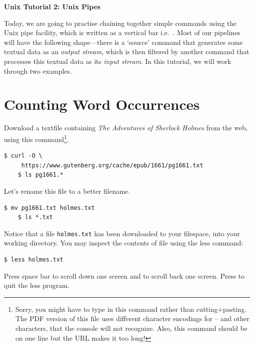 \documentclass{article}
\begin{document}
  
\noindent
{\Large \textsf{\textbf{Unix Tutorial 2: Unix Pipes}}}

\bigskip


Today, we are going to practise chaining together simple commands using the Unix pipe facility, which is written as a vertical bar i.e.\ \textbar.
Most of our pipelines will have the following shape---there is a `source' command that generates some textual data as an \textit{output stream}, which is then filtered by another command that processes this textual data as its \textit{input stream}. In this tutorial, we will work through two examples.

\section*{Counting Word Occurrences}

Download a textfile containing \textit{The Adventures of Sherlock Holmes} from the web, using this command\footnote{Sorry, you might have to type in this command rather than cutting+pasting. The PDF version of this file uses different character encodings for -- and other characters, that the console will not recognize. Also, this command should be on one line but the URL makes it too long!}.
\begin{lstlisting}[style=BashInputStyle]
    $ curl -O \
     https://www.gutenberg.org/cache/epub/1661/pg1661.txt
    $ ls pg1661.*
\end{lstlisting}
Let's rename this file to a better filename.

\begin{lstlisting}[style=BashInputStyle]
    $ mv pg1661.txt holmes.txt
    $ ls *.txt
\end{lstlisting}


Notice that a file \texttt{holmes.txt} has been downloaded to your filespace, into your working directory. You may inspect the contents of file using the less command:

\begin{lstlisting}[style=BashInputStyle]
    $ less holmes.txt
\end{lstlisting}

Press space bar to scroll down one screen and  to scroll back one screen. Press  to quit the less program.
\end{document}
